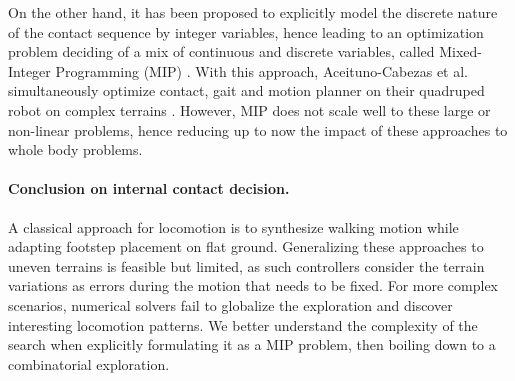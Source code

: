 On the other hand, it has been proposed to explicitly model the discrete nature of the contact sequence by integer variables, hence leading to an optimization problem deciding of a mix of continuous and discrete variables, called Mixed-Integer Programming (MIP) \cite{gurobi_mip}.
With this approach, Aceituno-Cabezas et al. simultaneously optimize contact, gait and motion planner on their quadruped robot on complex terrains \cite{carlos_2019}.
However, MIP does not scale well to these large or non-linear problems, hence reducing up to now the impact of these approaches to whole body problems.


\paragraph{Conclusion on internal contact decision.}
A classical approach for locomotion is to synthesize walking motion while adapting footstep placement on flat ground.
Generalizing these approaches to uneven terrains is feasible but limited, as such controllers consider the terrain variations as errors during the motion that needs to be fixed.
For more complex scenarios, numerical solvers fail to globalize the exploration and discover interesting locomotion patterns.
We better understand the complexity of the search when explicitly formulating it as a MIP problem, then boiling down to a combinatorial exploration.

